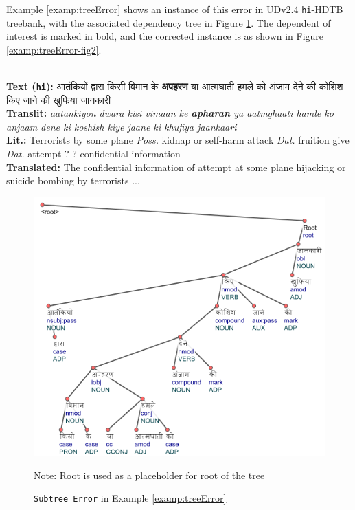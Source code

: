 Example \ref{examp:treeError} shows an instance of this error in UDv2.4 \texttt{hi}-HDTB treebank, with the associated dependency tree in Figure \ref{examp:treeError-fig}. The dependent of interest is marked in bold, and the corrected instance is as shown in Figure \ref{examp:treeError-fig2}.
\begin{example}
\label{examp:treeError}
\textbf{ }\\
\textbf{Text (\texttt{hi}):} \texthindi{आतंकियों द्वारा किसी विमान के \textbf{अपहरण} या आत्मघाती हमले को अंजाम देने की कोशिश किए जाने की खुफिया जानकारी}\\
\textbf{Translit:} \textit{aatankiyon dwara kisi vimaan ke \textbf{apharan} ya aatmghaati hamle ko anjaam dene ki koshish kiye jaane ki khufiya jaankaari}\\
\textbf{Lit.:} Terrorists by some plane \textit{Poss.} kidnap or self-harm attack \textit{Dat.} fruition give \textit{Dat.} attempt ? ? confidential information\\
\textbf{Translated:} The confidential information of attempt at some plane hijacking or suicide bombing by terrorists ...
\end{example}

\begin{figure}[H]
    \centering
    \includegraphics[scale=0.7]{img/treeError.png}
    \caption{\texttt{Subtree Error} in Example \ref{examp:treeError}}
    \label{examp:treeError-fig}
    Note: Root is used as a placeholder for root of the tree
\end{figure}

